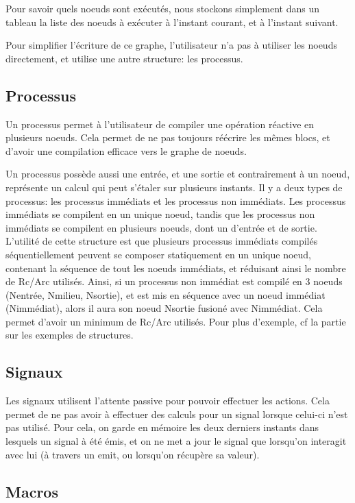 \documentclass[a4paper]{article}
\renewcommand{\(}{\left(}
\renewcommand{\)}{\right)}
\begin{document}
Pour savoir quels noeuds sont exécutés, nous stockons simplement dans un tableau
la liste des noeuds à exécuter à l'instant courant, et à l'instant suivant.

Pour simplifier l'écriture de ce graphe, l'utilisateur n'a pas à utiliser les
noeuds directement, et utilise une autre structure: les processus.

\subsection{Processus}
Un processus permet à l'utilisateur de compiler une opération
réactive en plusieurs noeuds. Cela permet de ne pas toujours réécrire les mêmes
blocs, et d'avoir une compilation efficace vers le graphe de noeuds.

Un processus possède aussi une entrée, et une sortie et contrairement à un
noeud, représente un calcul qui peut s'étaler sur plusieurs instants.
Il y a deux types de
processus: les processus immédiats et les processus non immédiats. Les processus
immédiats se compilent en un unique noeud, tandis que les processus non
immédiats se compilent en plusieurs noeuds, dont un d'entrée et de sortie.
L'utilité de cette structure est que plusieurs processus immédiats compilés
séquentiellement peuvent se composer statiquement en un unique noeud, contenant la séquence
de tout les noeuds immédiats, et réduisant ainsi le nombre de Rc/Arc utilisés.
Ainsi, si un processus non immédiat est compilé en 3 noeuds (Nentrée, Nmilieu,
Nsortie), et est mis en séquence avec un noeud immédiat (Nimmédiat), alors
il aura son noeud Nsortie fusioné avec Nimmédiat.
Cela permet d'avoir un minimum de Rc/Arc utilisés. Pour plus d'exemple, cf la
partie sur les exemples de structures.

\subsection{Signaux}

Les signaux utilisent l'attente passive pour pouvoir effectuer les actions. Cela
permet de ne pas avoir à effectuer des calculs pour un signal lorsque celui-ci
n'est pas utilisé. Pour cela, on garde en mémoire les deux derniers instants
dans lesquels un signal à été émis, et on ne met a jour le signal que lorsqu'on
interagit avec lui (à travers un emit, ou lorsqu'on récupère sa valeur).

\subsection{Macros}
\end{document}
